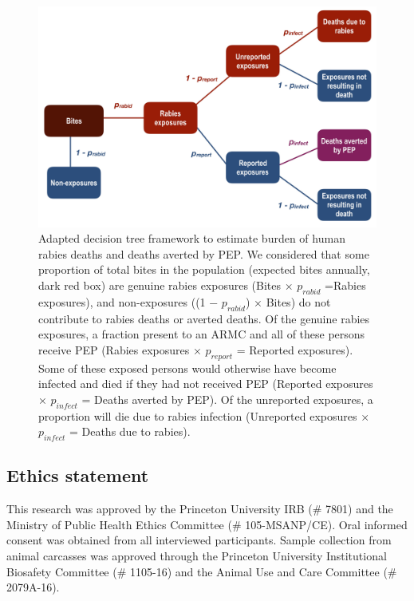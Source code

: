 \documentclass[
  oneside]{book}
\begin{document}
\begin{figure}
\includegraphics[width=0.95\linewidth]{figs/ch1/fig1} \caption[Adapted decision tree framework to estimate burden of human rabies deaths and deaths averted by PEP.]{Adapted decision tree framework to estimate burden of human rabies deaths and deaths averted by PEP. We considered that some proportion of total bites in the population (expected bites annually, dark red box) are genuine rabies exposures (Bites × \(p_{rabid}\) =Rabies exposures), and non-exposures ((1 − \(p_{rabid}\)) × Bites) do not contribute to rabies deaths or averted deaths. Of the genuine rabies exposures, a fraction present to an ARMC and all of these persons receive PEP (Rabies exposures × \(p_{report}\) = Reported exposures). Some of these exposed persons would otherwise have become infected and died if they had not received PEP (Reported exposures × \(p_{infect}\) = Deaths averted by PEP). Of the unreported exposures, a proportion will die due to rabies infection (Unreported exposures × \(p_{infect}\) = Deaths due to rabies).}\label{fig:fig1}
\end{figure}



\hypertarget{ethics-statement}{%
\subsection{Ethics statement}\label{ethics-statement}}

This research was approved by the Princeton University IRB (\# 7801) and the Ministry of Public Health Ethics Committee (\# 105-MSANP/CE). Oral informed consent was obtained from all interviewed participants. Sample collection from animal carcasses was approved through the Princeton University Institutional Biosafety Committee (\# 1105-16) and the Animal Use and Care Committee (\# 2079A-16).
\end{document}
